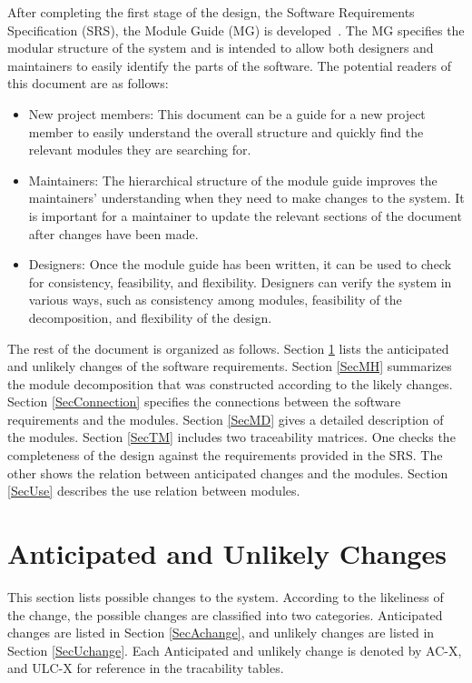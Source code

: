 \documentclass[12pt, titlepage]{article}
\begin{document}
After completing the first stage of the design, the Software Requirements
Specification (SRS), the Module Guide (MG) is developed~\citep{ParnasEtAl1984}. The MG
specifies the modular structure of the system and is intended to allow both
designers and maintainers to easily identify the parts of the software.  The
potential readers of this document are as follows:

\begin{itemize}
\item New project members: This document can be a guide for a new project member
  to easily understand the overall structure and quickly find the
  relevant modules they are searching for.
\item Maintainers: The hierarchical structure of the module guide improves the
  maintainers' understanding when they need to make changes to the system. It is
  important for a maintainer to update the relevant sections of the document
  after changes have been made.
\item Designers: Once the module guide has been written, it can be used to
  check for consistency, feasibility, and flexibility. Designers can verify the
  system in various ways, such as consistency among modules, feasibility of the
  decomposition, and flexibility of the design.
\end{itemize}

The rest of the document is organized as follows. Section
\ref{SecChange} lists the anticipated and unlikely changes of the software
requirements. Section \ref{SecMH} summarizes the module decomposition that
was constructed according to the likely changes. Section \ref{SecConnection}
specifies the connections between the software requirements and the
modules. Section \ref{SecMD} gives a detailed description of the
modules. Section \ref{SecTM} includes two traceability matrices. One checks
the completeness of the design against the requirements provided in the SRS. The
other shows the relation between anticipated changes and the modules. Section
\ref{SecUse} describes the use relation between modules.

\section{Anticipated and Unlikely Changes} \label{SecChange}

This section lists possible changes to the system. According to the likeliness
of the change, the possible changes are classified into two
categories. Anticipated changes are listed in Section \ref{SecAchange}, and
unlikely changes are listed in Section \ref{SecUchange}. Each Anticipated and
unlikely change is denoted by AC-X, and ULC-X for reference in the tracability tables.
\end{document}
